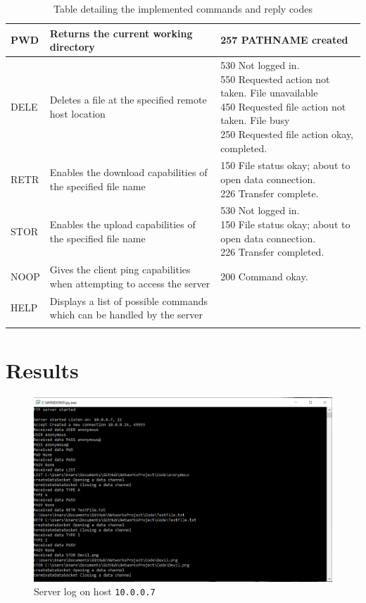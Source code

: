 \documentclass[10pt,twocolumn]{witseiepaper}
\def\code#1{\texttt{#1}}
\begin{document}
\begin{appendices}
\begin{longtable}{|p{2cm}|p{7cm}|p{8cm}|}
	\hline  
	PWD	& Returns the current working directory & 257 PATHNAME created \\ 
	\hline 
	
	DELE	& Deletes a file at the specified remote host location & \makecell[l]{530 Not logged in. \\550 Requested action not taken. File unavailable \\450 Requested file action not taken. File busy \\250 Requested file action okay, completed.} \\ 
	\hline 
	
	RETR	& Enables the download capabilities of the specified file name &  \makecell[l]{150 File status okay; about to open data connection. \\226 Transfer complete.} \\ 
	\hline 
	
	STOR	& Enables the upload capabilities of the specified file name &  \makecell[l]{530 Not logged in. \\150 File status okay; about to open data connection. \\226 Transfer completed.} \\ 
	\hline 
	
	NOOP	& Gives the client ping capabilities when attempting to access the server & 200 Command okay. \\ 
	\hline 
	
	HELP	& Displays a list of possible commands which can be handled by the server &  \\ 
	\hline 
	\caption{Table detailing the implemented commands and reply codes}	
\end{longtable}
\pagebreak
\section{Results}
\label{app: Results}

\begin{figure}[h!]
\renewcommand{\thefigure}{\arabic{figure}}
\centering
\includegraphics[scale=0.6]{Server.png}
\caption{Server log on host \code{10.0.0.7}}
\label{fig: Server log}
\end{figure}


\end{appendices}
\end{document}
